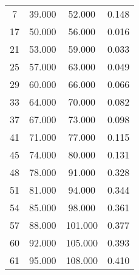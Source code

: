 % 
\begin{tabular}{cccc}
  \hline
  \hline
7 & 39.000 & 52.000 & 0.148 \\ 
  17 & 50.000 & 56.000 & 0.016 \\ 
  21 & 53.000 & 59.000 & 0.033 \\ 
  25 & 57.000 & 63.000 & 0.049 \\ 
  29 & 60.000 & 66.000 & 0.066 \\ 
  33 & 64.000 & 70.000 & 0.082 \\ 
  37 & 67.000 & 73.000 & 0.098 \\ 
  41 & 71.000 & 77.000 & 0.115 \\ 
  45 & 74.000 & 80.000 & 0.131 \\ 
  48 & 78.000 & 91.000 & 0.328 \\ 
  51 & 81.000 & 94.000 & 0.344 \\ 
  54 & 85.000 & 98.000 & 0.361 \\ 
  57 & 88.000 & 101.000 & 0.377 \\ 
  60 & 92.000 & 105.000 & 0.393 \\ 
  61 & 95.000 & 108.000 & 0.410 \\ 
   \hline
\end{tabular}
